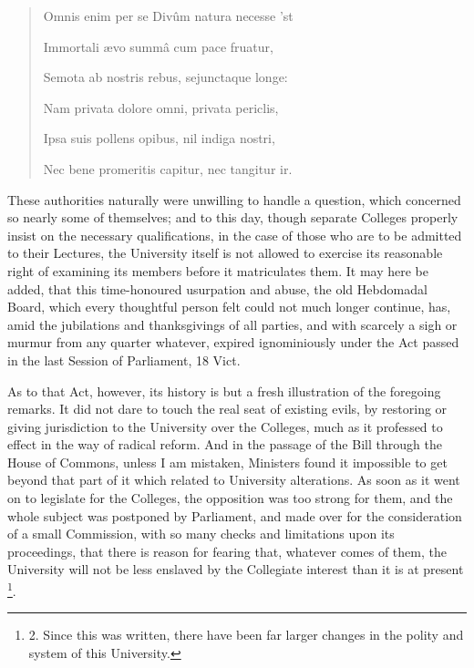 \begin{quote}

Omnis enim per se Divûm
natura necesse 'st

Immortali ævo summâ cum pace fruatur,

Semota ab nostris rebus, sejunctaque longe:

Nam privata dolore omni, privata periclis,

Ipsa suis pollens opibus, nil indiga nostri,

Nec bene promeritis capitur, nec tangitur ir.

\end{quote}

These authorities naturally
were unwilling to handle a question, which concerned so nearly some of
themselves; and to this day, though separate Colleges properly insist
on the necessary qualifications, in the case of those who are to be
admitted to their Lectures, the University itself is not allowed to
exercise its reasonable right of examining its members before it
matriculates them. It may here be added, that this time-honoured
usurpation and abuse, the old Hebdomadal Board, which every thoughtful
person felt could not much longer continue, has, amid the jubilations
and thanksgivings of all parties, and with scarcely a sigh or murmur
from any quarter whatever, expired ignominiously under the Act passed
in the last Session of Parliament, 18 Vict.

As to that Act, however, its
history is but a fresh illustration of the foregoing remarks. It did
not dare to touch the real seat of existing evils, by restoring or
giving jurisdiction to the University over the Colleges, much as it
professed to effect in the way of radical reform. And in the passage
of the Bill through the House of Commons, unless I am mistaken,
Ministers found it impossible to get beyond that part of it which
related to University alterations. As soon as it went on to legislate
for the Colleges, the opposition was too strong for them, and the
whole subject was postponed by Parliament, and made over for the
consideration of a small Commission, with so many checks and
limitations upon its proceedings, that there is reason for fearing
that, whatever comes of them, the University will not be less enslaved
by the Collegiate interest than it is at present \footnote{2.
Since this was written, there have been far larger changes in the
polity and system of this University.}.


